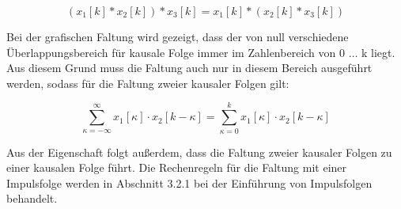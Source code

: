 \begin{equation}\label{eq:fourninetyfive}
\left(x_{1} \left[k\right]*x_{2} \left[k\right]\right)*x_{3} \left[k\right]=x_{1} \left[k\right]*\left(x_{2} \left[k\right]*x_{3} \left[k\right]\right)
\end{equation}

\noindent Bei der grafischen Faltung wird gezeigt, dass der von null verschiedene \"{U}berlappungsbereich f\"{u}r kausale Folge immer im Zahlenbereich von 0 $\dots$ k liegt. Aus diesem Grund muss die Faltung auch nur in diesem Bereich ausgef\"{u}hrt werden, sodass f\"{u}r die Faltung zweier kausaler Folgen gilt:

\begin{equation}\label{eq:fourninetysix}
\sum _{\kappa =-\infty }^{\infty }x_{1} \left[\kappa \right]\cdot x_{2} \left[k-\kappa \right] =\sum _{\kappa =0}^{k}x_{1} \left[\kappa \right]\cdot x_{2} \left[k-\kappa \right] 
\end{equation}

\noindent Aus der Eigenschaft folgt au{\ss}erdem, dass die Faltung zweier kausaler Folgen zu einer kausalen Folge f\"{u}hrt. Die Rechenregeln f\"{u}r die Faltung mit einer Impulsfolge werden in Abschnitt 3.2.1 bei der Einf\"{u}hrung von Impulsfolgen behandelt. 

